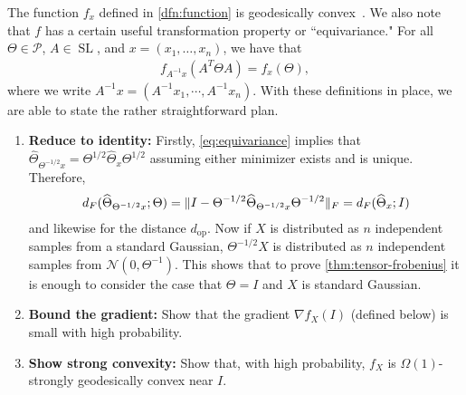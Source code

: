 \documentclass{article}
\DeclarePairedDelimiter{\norm}{\lVert}{\rVert}
\newcommand{\op}{\operatorname{op}}
\renewcommand{\vec}{\bm}
\newcommand\cN{\mathcal{N}}
\newcommand\SL{\operatorname{SL}}
\newcommand\SPD{\mathcal{P}}
\newcommand\samp{x}
\newcommand\rv{X}
\newcommand\tr{\operatorname{Tr}}
\newcommand{\CF}[1]{{\color{purple}[CF: #1]}}
\newcommand{\MW}[1]{{\color{red}[MW: #1]}}
\begin{document}
The function $f_{\samp}$ defined in \cref{dfn:function} is geodesically convex~\cite{burgisser2019towards}. 
We also note that $f$ has a certain useful transformation property or ``equivariance." For all $\Theta \in \SPD$, $A \in \SL$, and $\samp=(\samp_1,\dots,\samp_n)$, we have that
\begin{align}\label{eq:equivariance}
  f_{A^{-1} \samp}(A^T \Theta A) = f_{\samp}(\Theta),
\end{align}
where we write $A^{-1} \samp = (A^{-1} \samp_1,\cdots,A^{-1} \samp_n)$.
With these definitions in place, we are able to state the rather straightforward plan.

\begin{enumerate}
\item\label{it:reduce} \textbf{Reduce to identity:}
Firstly, \cref{eq:equivariance} implies that $\widehat\Theta_{\Theta^{-1/2} \samp} = \Theta^{1/2} \widehat\Theta_{\samp} \Theta^{1/2}$ assuming either minimizer exists and is unique.
Therefore,
\begin{align*}
  d_F(\widehat\Theta_{\Theta^{-1/2} \samp}; \Theta)
= \norm{ I - \Theta^{-1/2} \widehat\Theta_{\Theta^{-1/2} \samp} \Theta^{-1/2} }_F
= d_F(\widehat\Theta_{\samp}; I)
\end{align*}
and likewise for the distance $d_{\op}$.
Now if $\rv$ is distributed as $n$ independent samples from a standard Gaussian, $\Theta^{-1/2} \rv$ is distributed as $n$ independent samples from $\cN(0, \Theta^{-1})$.
This shows that to prove \cref{thm:tensor-frobenius} it is enough to consider the case that $\Theta = I$ and $\rv$ is standard Gaussian.
\item\label{it:grad} \textbf{Bound the gradient:}
Show that the gradient $\nabla f_{\rv}(I)$ (defined below) is small with high probability.
\item\label{it:convexity} \textbf{Show strong convexity:}
Show that, with high probability, $f_{\rv}$ is $\Omega(1)$-strongly geodesically convex near $I$.
\end{enumerate}
\end{document}
